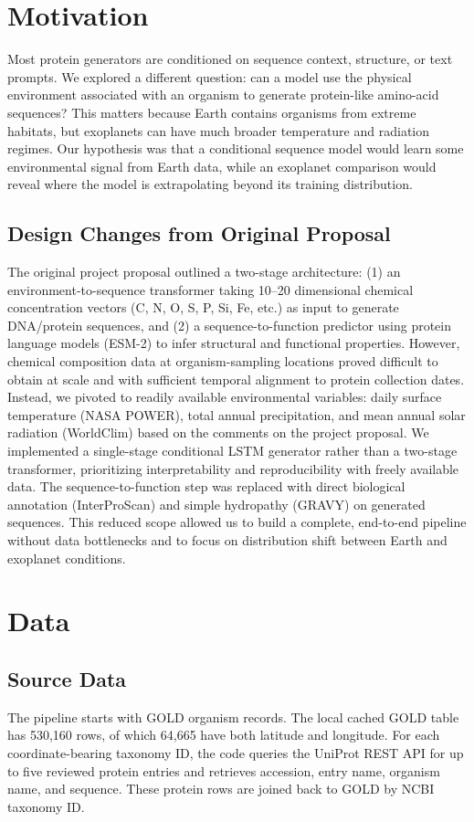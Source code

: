 \documentclass[11pt]{article}
\begin{document}
\section{Motivation}
Most protein generators are conditioned on sequence context, structure, or text
prompts. We explored a different question: can a model use the physical
environment associated with an organism to generate protein-like amino-acid
sequences? This matters because Earth contains organisms from extreme habitats,
but exoplanets can have much broader temperature and radiation regimes. Our
hypothesis was that a conditional sequence model would learn some environmental
signal from Earth data, while an exoplanet comparison would reveal where the
model is extrapolating beyond its training distribution.

\subsection{Design Changes from Original Proposal}
The original project proposal outlined a two-stage architecture: (1) an
environment-to-sequence transformer taking 10--20 dimensional chemical
concentration vectors (C, N, O, S, P, Si, Fe, etc.) as input to generate
DNA/protein sequences, and (2) a sequence-to-function predictor using protein
language models (ESM-2) to infer structural and functional properties. However,
chemical composition data at organism-sampling locations proved difficult to
obtain at scale and with sufficient temporal alignment to protein collection
dates. Instead, we pivoted to readily available environmental variables: daily
surface temperature (NASA POWER), total annual precipitation, and mean annual
solar radiation (WorldClim) based on the comments on the project proposal.
We implemented a single-stage conditional LSTM generator rather than a two-stage
transformer, prioritizing interpretability and reproducibility with freely
available data. The sequence-to-function step was replaced with direct
biological annotation (InterProScan) and simple hydropathy (GRAVY) on
generated sequences. This reduced scope allowed us to build a complete,
end-to-end pipeline without data bottlenecks and to focus on distribution shift
between Earth and exoplanet conditions.

\section{Data}
\subsection{Source Data}
The pipeline starts with GOLD organism records. The local cached GOLD table has
530,160 rows, of which 64,665 have both latitude and longitude. For each
coordinate-bearing taxonomy ID, the code queries the UniProt REST API for up to
five reviewed protein entries and retrieves accession, entry name, organism
name, and sequence. These protein rows are joined back to GOLD by NCBI taxonomy
ID.
\end{document}
